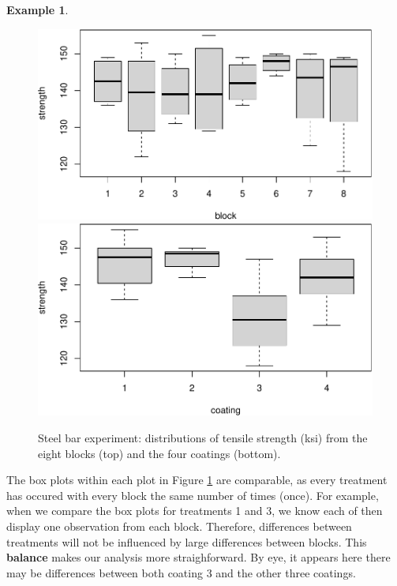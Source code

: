 \documentclass[
]{book}
\theoremstyle{definition}
\theoremstyle{definition}
\newtheorem{example}{Example}[chapter]
\theoremstyle{definition}
\theoremstyle{definition}
\theoremstyle{remark}
\begin{document}
\begin{example}
\begin{figure}
{\centering \includegraphics{bookdown_math3014-6027_files/figure-latex/bar-expt-boxplots-1} \includegraphics{bookdown_math3014-6027_files/figure-latex/bar-expt-boxplots-2} 

}

\caption{Steel bar experiment: distributions of tensile strength (ksi) from the eight blocks (top) and the four coatings (bottom).}\label{fig:bar-expt-boxplots}
\end{figure}

The box plots within each plot in Figure \ref{fig:bar-expt-boxplots} are comparable, as every treatment has occured with every block the same number of times (once). For example, when we compare the box plots for treatments 1 and 3, we know each of then display one observation from each block. Therefore, differences between treatments will not be influenced by large differences between blocks. This \textbf{balance} makes our analysis more straighforward. By eye, it appears here there may be differences between both coating 3 and the other three coatings.
\end{example}
\end{document}
